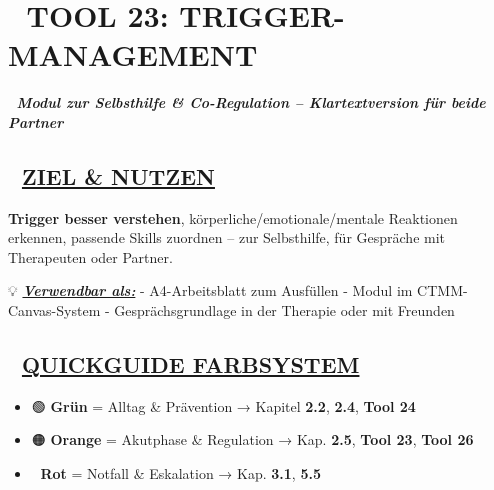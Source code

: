 %


\hypertarget{tool-23-trigger-management}{%
\section{\texorpdfstring{📄 \textbf{TOOL 23: TRIGGER-MANAGEMENT}}{📄 TOOL 23: TRIGGER-MANAGEMENT}}\label{tool-23-trigger-management}}

🧩 \emph{\textbf{Modul zur Selbsthilfe \& Co-Regulation -- Klartextversion für beide Partner}}

\hypertarget{ziel-nutzen}{%
\subsection{\texorpdfstring{🎯 \textbf{\ul{ZIEL \& NUTZEN}}}{🎯 ZIEL \& NUTZEN}}\label{ziel-nutzen}}

\textbf{Trigger besser verstehen}, körperliche/emotionale/mentale Reaktionen erkennen, passende Skills zuordnen -- zur Selbsthilfe, für Gespräche mit Therapeuten oder Partner.

💡 \emph{\textbf{\ul{Verwendbar als:}}} - A4-Arbeitsblatt zum Ausfüllen - Modul im CTMM-Canvas-System - Gesprächsgrundlage in der Therapie oder mit Freunden

\hypertarget{section}{%
\subsection{}\label{section}}

\hypertarget{quickguide-farbsystem}{%
\subsection{\texorpdfstring{🧭 \textbf{\ul{QUICKGUIDE FARBSYSTEM}}}{🧭 QUICKGUIDE FARBSYSTEM}}\label{quickguide-farbsystem}}

\begin{itemize}
\tightlist
\item
  🟢 \textbf{Grün} = Alltag \& Prävention → Kapitel \textbf{2.2}, \textbf{2.4}, \textbf{Tool 24}
\item
  🟠 \textbf{Orange} = Akutphase \& Regulation → Kap. \textbf{2.5}, \textbf{Tool 23}, \textbf{Tool 26}
\item
  🔴 \textbf{Rot} = Notfall \& Eskalation → Kap. \textbf{3.1}, \textbf{5.5}
\end{itemize}

